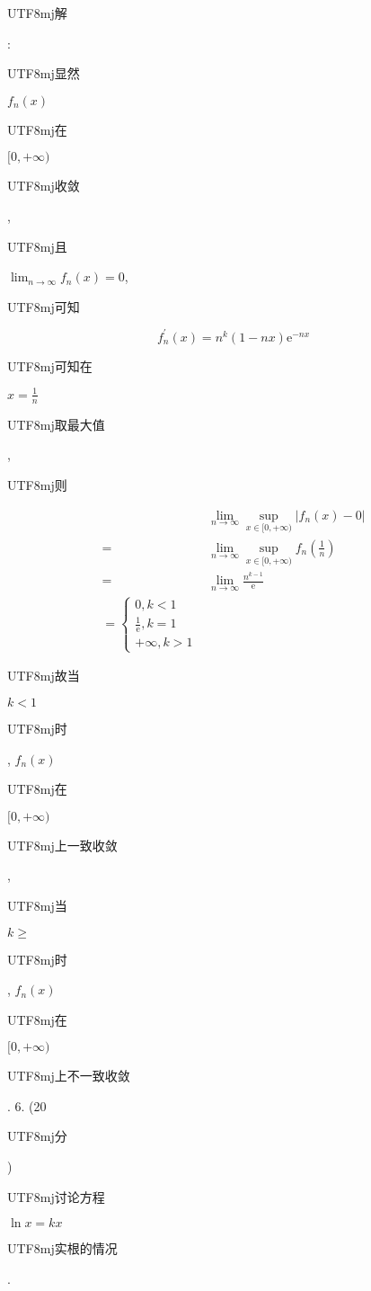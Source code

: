 \documentclass[10pt]{article}
\begin{document}
\begin{CJK}{UTF8}{mj}解\end{CJK}: \begin{CJK}{UTF8}{mj}显然\end{CJK} $f_{n}(x)$ \begin{CJK}{UTF8}{mj}在\end{CJK} $[0,+\infty)$ \begin{CJK}{UTF8}{mj}收敛\end{CJK}, \begin{CJK}{UTF8}{mj}且\end{CJK} $\lim _{n \rightarrow \infty} f_{n}(x)=0$, \begin{CJK}{UTF8}{mj}可知\end{CJK}
$$
f_{n}^{\prime}(x)=n^{k}(1-n x) \mathrm{e}^{-n x}
$$
\begin{CJK}{UTF8}{mj}可知在\end{CJK} $x=\frac{1}{n}$ \begin{CJK}{UTF8}{mj}取最大值\end{CJK}, \begin{CJK}{UTF8}{mj}则\end{CJK}
$$
\begin{aligned}
& \lim _{n \rightarrow \infty} \sup _{x \in[0,+\infty)}\left|f_{n}(x)-0\right| \\
=& \lim _{n \rightarrow \infty} \sup _{x \in[0,+\infty)} f_{n}\left(\frac{1}{n}\right) \\
=& \lim _{n \rightarrow \infty} \frac{n^{k-1}}{\mathrm{e}} \\
=\left\{\begin{array}{l}
0, k<1 \\
\frac{1}{\mathrm{e}}, k=1 \\
+\infty, k>1
\end{array}\right.
\end{aligned}
$$
\begin{CJK}{UTF8}{mj}故当\end{CJK} $k<1$ \begin{CJK}{UTF8}{mj}时\end{CJK}, $f_{n}(x)$ \begin{CJK}{UTF8}{mj}在\end{CJK} $[0,+\infty)$ \begin{CJK}{UTF8}{mj}上一致收敛\end{CJK}, \begin{CJK}{UTF8}{mj}当\end{CJK} $k \geq$ \begin{CJK}{UTF8}{mj}时\end{CJK}, $f_{n}(x)$ \begin{CJK}{UTF8}{mj}在\end{CJK} $[0,+\infty)$ \begin{CJK}{UTF8}{mj}上不一致收敛\end{CJK}. 6. (20 \begin{CJK}{UTF8}{mj}分\end{CJK}) \begin{CJK}{UTF8}{mj}讨论方程\end{CJK} $\ln x=k x$ \begin{CJK}{UTF8}{mj}实根的情况\end{CJK}.
\end{document}
